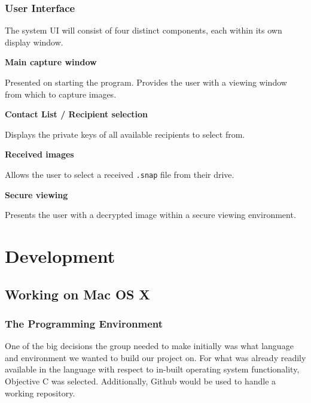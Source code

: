 \documentclass[11pt, a4paper,titlepage]{report}
\begin{document}
\subsection*{User Interface}
The system UI will consist of four distinct components, each within its own display window.
\begin{itemize*}
	\item[] \textbf{Main capture window}
		\begin{itemize*}
			\item[]  Presented on starting the program. Provides the user with a viewing window from which to capture images.
		\end{itemize*}
	\item[] \textbf{Contact List / Recipient selection}
		\begin{itemize*}
			\item[]  Displays the private keys of all available recipients to select from.
		\end{itemize*}
	\item[] \textbf{Received images}
		\begin{itemize*}
			\item[]  Allows the user to select a received \texttt{.snap} file from their drive.
		\end{itemize*}
	\item[] \textbf{Secure viewing}
		\begin{itemize*}
			\item[]  Presents the user with a decrypted image within a secure viewing environment.
		\end{itemize*}
\end{itemize*}


\chapter{Development}
\section*{Working on Mac OS X}
\subsection*{The Programming Environment}
One of the big decisions the group needed to make initially was what language and environment we wanted to build our project on. For what was already readily available in the language with respect to in-built operating system functionality, Objective C was selected. Additionally, Github would be used to handle a working repository.
\end{document}
